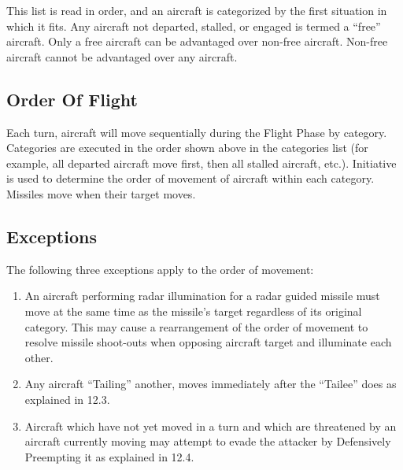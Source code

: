 This list is read in order, and an aircraft is categorized by the first situation in which it fits. Any aircraft not departed, stalled, or engaged is termed a “free” aircraft. Only a free aircraft can be advantaged over non-free aircraft. Non-free aircraft cannot be advantaged over any aircraft.



\subsection{Order Of Flight} Each turn, aircraft will move sequentially during the Flight Phase by category. Categories are executed in the order shown above in the categories list (for example, all departed aircraft move first, then all stalled aircraft, etc.). Initiative is used to determine the order of movement of aircraft within each category. Missiles move when their target moves.

\subsection{Exceptions} The following three exceptions apply to the order of movement:

\begin{enumerate}

    \item{} An aircraft performing radar illumination for a radar guided missile must move at the same time as the missile's target regardless of its original category. This may cause a rearrangement of the order of movement to resolve missile shoot-outs when opposing aircraft target and illuminate each other.

    \item{} Any aircraft “Tailing” another, moves immediately after the “Tailee” does as explained in  12.3.

    \item{} Aircraft which have not yet moved in a turn and which are threatened by an aircraft currently moving may attempt to evade the attacker by Defensively Preempting it as explained in 12.4.

\end{enumerate}


